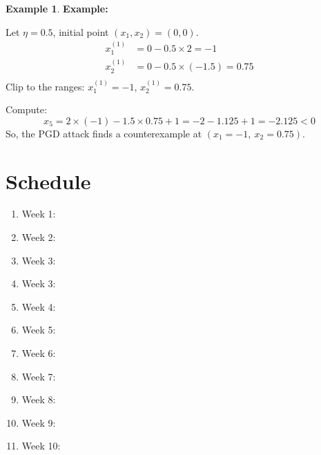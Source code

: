 \documentclass[oneside,11pt,dvipsnames]{book}
\numberwithin{equation}{section}
\theoremstyle{definition}
\newtheorem{example}{Example}[section]
\theoremstyle{remark}
\begin{document}
\begin{example}
\textbf{Example:}

Let $\eta = 0.5$, initial point $(x_1, x_2) = (0, 0)$.
\begin{align*}
x_1^{(1)} &= 0 - 0.5 \times 2 = -1 \\
x_2^{(1)} &= 0 - 0.5 \times (-1.5) = 0.75 \\
\end{align*}
Clip to the ranges: $x_1^{(1)} = -1$, $x_2^{(1)} = 0.75$.

Compute:
\[
x_5 = 2 \times (-1) - 1.5 \times 0.75 + 1 = -2 - 1.125 + 1 = -2.125 < 0
\]
So, the PGD attack finds a counterexample at $(x_1 = -1,\ x_2 = 0.75)$.

\end{example}



\chapter{Schedule}

\begin{enumerate}
    \item Week 1: 
    \item Week 2:
    \item Week 3: 
    \item Week 3:    
    \item Week 4:
    \item Week 5:
    \item Week 6:
    \item Week 7:
    \item Week 8:
    \item Week 9:
    \item Week 10:
\end{enumerate}    





\appendix
\end{document}
